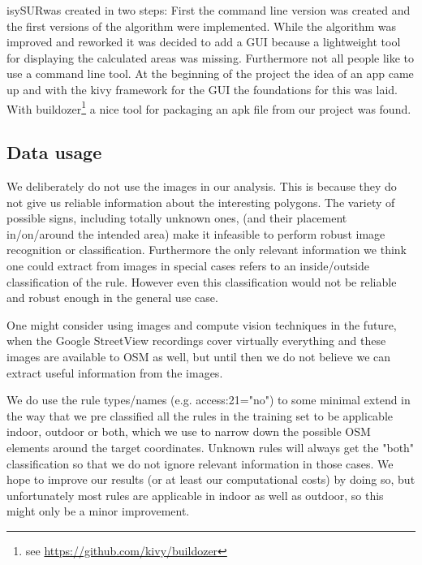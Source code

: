 \documentclass[11pt,fleqn]{book} %
\newcommand{\todol}{\todo[inline]} %
\newcommand{\ProjectTitle}{isySUR}
\newcommand{\pt}{\ProjectTitle}
\begin{document}
\pt was created in two steps: First the command line version was created and the first versions of the algorithm were implemented. While the algorithm was improved and reworked it was decided to add a GUI because a lightweight tool for displaying the calculated areas was missing. Furthermore not all people like to use a command line tool. At the beginning of the project the idea of an app came up and with the kivy framework for the GUI the foundations for this was laid. With buildozer\footnote{see \url{https://github.com/kivy/buildozer}} a nice tool for packaging an apk file from our project was found.

\subsection{Data usage}\label{sec:config}
We deliberately do not use the images in our analysis. This is because they do not give us reliable information about the interesting polygons. The variety of possible signs, including totally unknown ones, (and their placement in/on/around the intended area) make it infeasible to perform robust image recognition or classification. Furthermore the only relevant information we think one could extract from images in special cases refers to an inside/outside classification of the rule. However even this classification would not be reliable and robust enough in the general use case.

One might consider using images and compute vision techniques in the future, when the Google StreetView recordings cover virtually everything and these images are available to OSM as well, but until then we do not believe we can extract useful information from the images.

We do use the rule types/names (e.g. access:21="no") to some minimal extend in the way that we pre classified all the rules in the training set to be applicable indoor, outdoor or both, which we use to narrow down the possible OSM elements around the target coordinates. Unknown rules will always get the "both" classification so that we do not ignore relevant information in those cases. We hope to improve our results (or at least our computational costs) by doing so, but unfortunately most rules are applicable in indoor as well as outdoor, so this might only be a minor improvement.

\todol{Maybe an image of the pipeline?}
\end{document}
